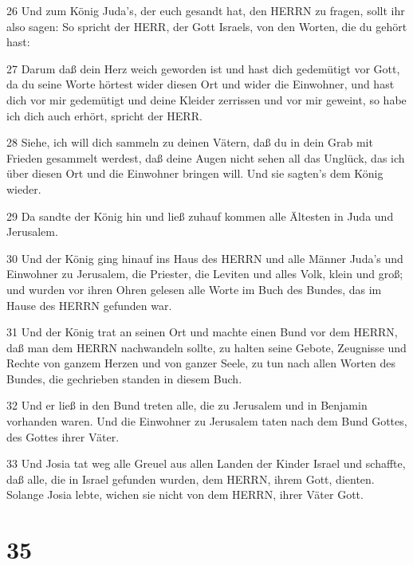 \par 26 Und zum König Juda's, der euch gesandt hat, den HERRN zu fragen, sollt ihr also sagen: So spricht der HERR, der Gott Israels, von den Worten, die du gehört hast:
\par 27 Darum daß dein Herz weich geworden ist und hast dich gedemütigt vor Gott, da du seine Worte hörtest wider diesen Ort und wider die Einwohner, und hast dich vor mir gedemütigt und deine Kleider zerrissen und vor mir geweint, so habe ich dich auch erhört, spricht der HERR.
\par 28 Siehe, ich will dich sammeln zu deinen Vätern, daß du in dein Grab mit Frieden gesammelt werdest, daß deine Augen nicht sehen all das Unglück, das ich über diesen Ort und die Einwohner bringen will. Und sie sagten's dem König wieder.
\par 29 Da sandte der König hin und ließ zuhauf kommen alle Ältesten in Juda und Jerusalem.
\par 30 Und der König ging hinauf ins Haus des HERRN und alle Männer Juda's und Einwohner zu Jerusalem, die Priester, die Leviten und alles Volk, klein und groß; und wurden vor ihren Ohren gelesen alle Worte im Buch des Bundes, das im Hause des HERRN gefunden war.
\par 31 Und der König trat an seinen Ort und machte einen Bund vor dem HERRN, daß man dem HERRN nachwandeln sollte, zu halten seine Gebote, Zeugnisse und Rechte von ganzem Herzen und von ganzer Seele, zu tun nach allen Worten des Bundes, die gechrieben standen in diesem Buch.
\par 32 Und er ließ in den Bund treten alle, die zu Jerusalem und in Benjamin vorhanden waren. Und die Einwohner zu Jerusalem taten nach dem Bund Gottes, des Gottes ihrer Väter.
\par 33 Und Josia tat weg alle Greuel aus allen Landen der Kinder Israel und schaffte, daß alle, die in Israel gefunden wurden, dem HERRN, ihrem Gott, dienten. Solange Josia lebte, wichen sie nicht von dem HERRN, ihrer Väter Gott.

\chapter{35}

